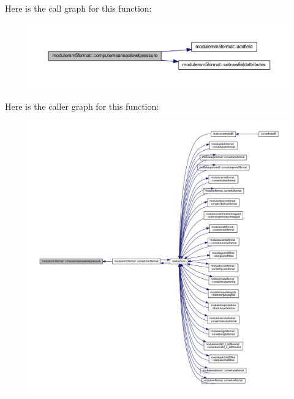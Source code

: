 Here is the call graph for this function\+:\nopagebreak
\begin{figure}[H]
\begin{center}
\leavevmode
\includegraphics[width=350pt]{namespacemodulemm5format_a2b31840d538f04c681c86a26a2feb21f_cgraph}
\end{center}
\end{figure}
Here is the caller graph for this function\+:\nopagebreak
\begin{figure}[H]
\begin{center}
\leavevmode
\includegraphics[width=350pt]{namespacemodulemm5format_a2b31840d538f04c681c86a26a2feb21f_icgraph}
\end{center}
\end{figure}
\mbox{\label{namespacemodulemm5format_a86c95504025ac2f03c9c7aa475a35cc4}} 
